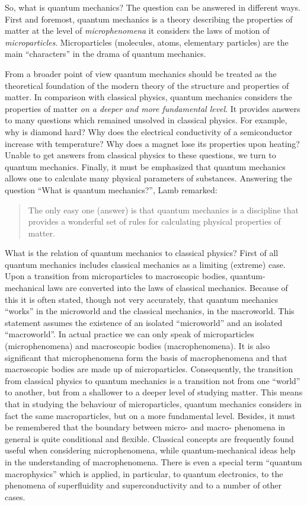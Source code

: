 \documentclass[a4paper,sfsidenotes,colorlinks=true]{tufte-book}
\numberwithin{equation}{section}
\numberwithin{figure}{section}
\begin{document}
So, what is quantum mechanics? The question can be answered in different ways. First and foremost, quantum mechanics is a theory describing the properties of matter at the level of \emph{microphenomena} it considers the laws of motion of \emph{microparticles}. Microparticles (molecules, atoms, elementary particles) are the main ``characters'' in the drama of quantum mechanics.

From a broader point of view quantum mechanics should be treated as the theoretical foundation of the modern theory of the structure and properties of matter. In comparison with classical physics, quantum mechanics considers the properties of matter \emph{on a deeper and more fundamental level}. It provides answers to many questions which remained unsolved in classical physics. For example, why is diamond hard? Why does the electrical conductivity of a semiconductor increase with temperature? Why does a magnet lose its properties upon heating? Unable to get answers from classical physics to these questions, we turn to quantum mechanics. Finally, it must be emphasized that quantum mechanics allows one to calculate many physical parameters of substances. Answering the question ``What is quantum mechanics?'', Lamb remarked: 
\begin{quote}
The only easy one (answer) is that quantum mechanics is a discipline that provides a wonderful set of rules for calculating physical properties of matter.\cite{lamb-1969}
\end{quote}

What is the relation of quantum mechanics to classical physics? First of all quantum mechanics includes classical mechanics as a limiting (extreme) case. Upon a transition from microparticles to macroscopic bodies, quantum-mechanical laws are converted into the laws of classical mechanics. Because of this it is often stated, though not very accurately, that quantum mechanics ``works'' in the microworld and the classical mechanics, in the macroworld. This statement assumes the existence of an isolated ``microworld'' and an isolated ``macroworld''. In actual practice we can only speak of microparticles (microphenomena) and macroscopic bodies (macrophenomena). It is also significant that microphenomena form the basis of macrophenomena and that macroscopic bodies are made up of microparticles. Consequently, the transition from classical physics to quantum mechanics is a transition not from one ``world'' to another, but from a shallower to a deeper level of studying matter. This means that in studying the behaviour of microparticles, quantum mechanics considers in fact the same macroparticles, but on a more fundamental level. Besides, it must be remembered that the boundary between micro- and macro- phenomena in general is quite conditional and flexible. Classical concepts are frequently found useful when considering microphenomena, while quantum-mechanical ideas help in the understanding of macrophenomena. There is even a special term ``quantum macrophysics'' which is applied, in particular, to quantum electronics, to the phenomena of superfluidity and superconductivity and to a number of other cases.
\end{document}

